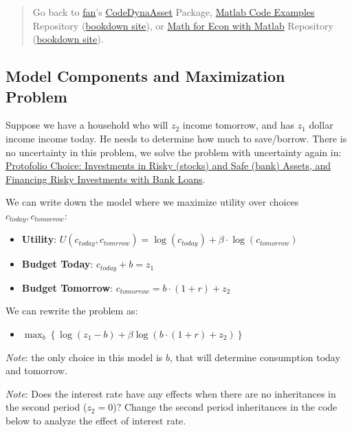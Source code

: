 \documentclass[
]{book}
\providecommand{\tightlist}{%
  \setlength{\itemsep}{0pt}\setlength{\parskip}{0pt}}
\begin{document}
\begin{quote}
Go back to \href{http://fanwangecon.github.io/}{fan}'s \href{https://fanwangecon.github.io/CodeDynaAsset/}{CodeDynaAsset} Package, \href{https://fanwangecon.github.io/M4Econ/}{Matlab Code Examples} Repository (\href{https://fanwangecon.github.io/M4Econ/bookdown}{bookdown site}), or \href{https://fanwangecon.github.io/Math4Econ/}{Math for Econ with Matlab} Repository (\href{https://fanwangecon.github.io/Math4Econ/bookdown}{bookdown site}).
\end{quote}

\hypertarget{model-components-and-maximization-problem}{%
\subsection{Model Components and Maximization Problem}\label{model-components-and-maximization-problem}}

Suppose we have a household who will \(z_2\) income tomorrow, and has
\(z_1\) dollar income income today. He needs to determine how much to
save/borrow. There is no uncertainty in this problem, we solve the
problem with uncertainty again in: \href{https://fanwangecon.github.io/Math4Econ/nonlinear/RiskyAsset.html}{Protofolio Choice: Investments in
Risky (stocks) and Safe (bank) Assets, and Financing Risky Investments
with Bank
Loans}.

We can write down the model where we maximize utility over choices
\(c_{today} ,c_{tomorrow}\):

\begin{itemize}
\item
  \textbf{Utility}:
  \(U(c_{today} ,c_{tomrrow} )=\log (c_{today} )+\beta \cdot \log (c_{tomorrow} )\)
\item
  \textbf{Budget Today}: \(c_{today} +b=z_1\)
\item
  \textbf{Budget Tomorrow}: \(c_{tomorrow} =b\cdot (1+r)+z_2\)
\end{itemize}

We can rewrite the problem as:

\begin{itemize}
\tightlist
\item
  \(\displaystyle \max_b \left\lbrace \log (z_1 -b)+\beta \log (b\cdot (1+r)+z_2 )\right\rbrace\)
\end{itemize}

\emph{Note}: the only choice in this model is \(b\), that will determine
consumption today and tomorrow.

\emph{Note}: Does the interest rate have any effects when there are no
inheritances in the second period (\(z_2 =0\))? Change the second period
inheritances in the code below to analyze the effect of interest rate.
\end{document}
